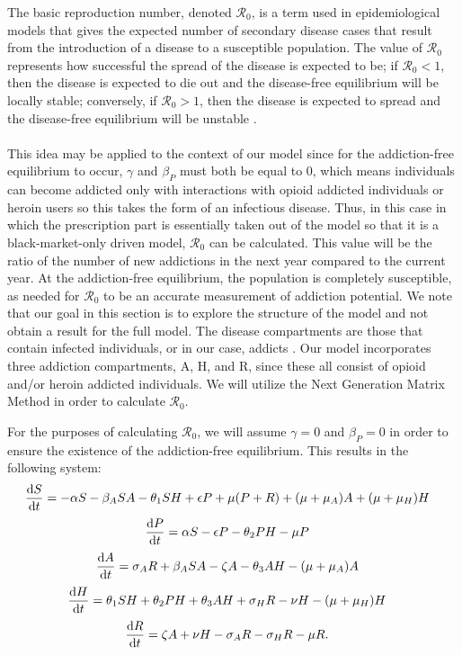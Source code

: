 \documentclass[12pt]{article}
\begin{document}
The basic reproduction number, denoted $\mathscr{R}_0$, is a term used in epidemiological models that gives the expected number of secondary disease cases that result from the introduction of a disease to a susceptible population. The value of $\mathscr{R}_0$ represents how successful the spread of the disease is expected to be; if $\mathscr{R}_0 < 1$, then the disease is expected to die out and the disease-free equilibrium will be locally stable; conversely, if $\mathscr{R}_0 >1$, then the disease is expected to spread and the disease-free equilibrium will be unstable \cite{Driessche}. \\ \\
 This idea may be applied to the context of our model since for the addiction-free equilibrium to occur, $\gamma$ and $\beta_{P}$ must both be equal to 0, which means individuals can become addicted only with interactions with opioid addicted individuals or heroin users so this takes the form of an infectious disease. Thus, in this case in which the prescription part is essentially taken out of the model so that it is a black-market-only driven model, $\mathscr{R}_0$ can be calculated. This value will be the ratio of the number of new addictions in the next year compared to the current year. At the addiction-free equilibrium, the population is completely susceptible, as needed for $\mathscr{R}_0$ to be an accurate measurement of addiction potential. 
We note that our goal in this section is to explore the structure of the model and not obtain a result for the full model. The disease compartments are those that contain infected individuals, or in our case, addicts \cite{Driessche}. Our model incorporates three addiction compartments, A, H, and R, since these all consist of opioid and/or heroin addicted individuals. We will utilize the Next Generation Matrix Method in order to calculate $\mathscr{R}_0$.


For the purposes of calculating $\mathscr{R}_0$, we will assume $\gamma =0$ and $\beta_{P} =0$ in order to ensure the existence of the addiction-free equilibrium. This results in the following system:
\[\dv{S}{t} = -\alpha S - \beta_{A} SA  - \theta_{1} SH +\epsilon P +\mu (P+R) + (\mu+\mu_{A})A + (\mu+\mu_{H}) H \quad \] 
\[\dv{P}{t} = \alpha S - \epsilon P  - \theta_{2}PH- \mu P    \quad\]
\[\dv{A}{t} = \sigma_{A} R +\beta_{A} SA  -\zeta A - \theta_{3}AH-(\mu + \mu_{A})A   \quad\]
\[\dv{H}{t} = \theta_{1}SH+\theta_{2}PH+\theta_{3}AH + \sigma_{H}R-\nu H-(\mu+\mu_{H})H  \quad\]
\[\dv{R}{t} = \zeta A +\nu H -\sigma_{A}R-\sigma_{H}R -\mu R.\quad\]
\end{document}
